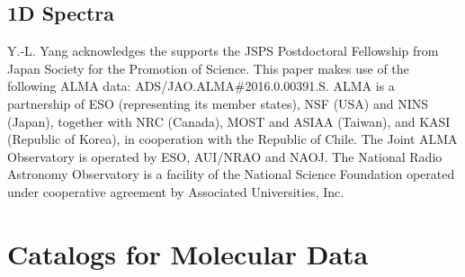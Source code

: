 \documentclass[twocolumn]{aastex62}
\begin{document}
\subsection{1D Spectra}

% 






% 

\acknowledgements
Y.-L. Yang acknowledges the supports the JSPS Postdoctoral Fellowship from Japan Society for the Promotion of Science.  This paper makes use of the following ALMA data: ADS/JAO.ALMA\#2016.0.00391.S. ALMA is a partnership of ESO (representing its member states), NSF (USA) and NINS (Japan), together with NRC (Canada), MOST and ASIAA (Taiwan), and KASI (Republic of Korea), in cooperation with the Republic of Chile. The Joint ALMA Observatory is operated by ESO, AUI/NRAO and NAOJ.  The National Radio Astronomy Observatory is a facility of the National Science Foundation operated under cooperative agreement by Associated Universities, Inc.



\appendix
\section{Catalogs for Molecular Data}
\label{sec:catalogs}


\end{document}
